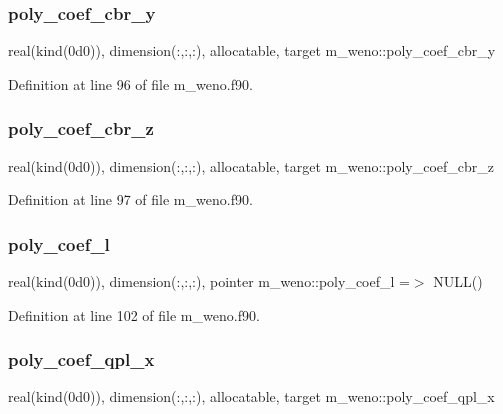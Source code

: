 \subsubsection{\texorpdfstring{poly\+\_\+coef\+\_\+cbr\+\_\+y}{poly\_coef\_cbr\_y}}
{\footnotesize\ttfamily real(kind(0d0)), dimension(\+:,\+:,\+:), allocatable, target m\+\_\+weno\+::poly\+\_\+coef\+\_\+cbr\+\_\+y}



Definition at line 96 of file m\+\_\+weno.\+f90.

\mbox{\label{namespacem__weno_aab74b0a22a637066057e5f69353d33e2}} 
\subsubsection{\texorpdfstring{poly\+\_\+coef\+\_\+cbr\+\_\+z}{poly\_coef\_cbr\_z}}
{\footnotesize\ttfamily real(kind(0d0)), dimension(\+:,\+:,\+:), allocatable, target m\+\_\+weno\+::poly\+\_\+coef\+\_\+cbr\+\_\+z}



Definition at line 97 of file m\+\_\+weno.\+f90.

\mbox{\label{namespacem__weno_a139be4d526326088bbeb2fb41ccea127}} 
\subsubsection{\texorpdfstring{poly\+\_\+coef\+\_\+l}{poly\_coef\_l}}
{\footnotesize\ttfamily real(kind(0d0)), dimension(\+:,\+:,\+:), pointer m\+\_\+weno\+::poly\+\_\+coef\+\_\+l =$>$ N\+U\+LL()}



Definition at line 102 of file m\+\_\+weno.\+f90.

\mbox{\label{namespacem__weno_a3a6911a019190d7e3daa3d6a188785bb}} 
\subsubsection{\texorpdfstring{poly\+\_\+coef\+\_\+qpl\+\_\+x}{poly\_coef\_qpl\_x}}
{\footnotesize\ttfamily real(kind(0d0)), dimension(\+:,\+:,\+:), allocatable, target m\+\_\+weno\+::poly\+\_\+coef\+\_\+qpl\+\_\+x}



